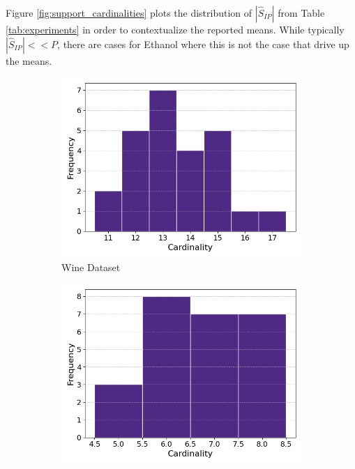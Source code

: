 Figure \ref{fig:support_cardinalities} plots the distribution of $|\widehat{S}_{IP}|$ from Table \ref{tab:experiments} in order to contextualize the reported means.
While typically $|\widehat{S}_{IP}| << P$, there are cases for Ethanol where this is not the case that drive up the means.

\begin{figure}[t]
    \centering
    \begin{subfigure}[b]{0.3\textwidth}
        \centering
        \includegraphics[width=\textwidth]{../figures/wine_cardinalities}
        \caption{Wine Dataset}
        \label{fig:wine_cardinalities}
    \end{subfigure}
    \hfill
    \begin{subfigure}[b]{0.3\textwidth}
        \centering
        \includegraphics[width=\textwidth]{..//figures/iris_cardinalities}

\end{subfigure}
\end{figure}
